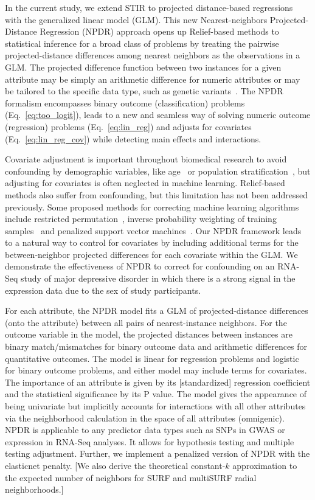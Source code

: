 \documentclass[10pt]{article}
\begin{document}
In the current study, we extend STIR to projected distance-based regressions with the generalized linear model (GLM).
This new Nearest-neighbors Projected-Distance Regression (NPDR) approach opens up Relief-based methods to statistical inference for a broad class of problems by treating the pairwise projected-distance differences among nearest neighbors as the observations in a GLM.
The projected difference function between two instances for a given attribute may be simply an arithmetic difference for numeric attributes or may be tailored to the specific data type, such as genetic variants~\cite{titv}.
The NPDR formalism encompasses binary outcome (classification) problems (Eq.~\ref{eq:too_logit}), leads to a new and seamless way of solving numeric outcome (regression) problems (Eq.~\ref{eq:lin_reg}) and adjusts for covariates (Eq.~\ref{eq:lin_reg_cov}) while detecting main effects and interactions. 

Covariate adjustment is important throughout biomedical research to avoid confounding by demographic variables, like age~\cite{le18_brainagesim} or population stratification~\cite{popstrat16}, but adjusting for covariates is often neglected in machine learning. Relief-based methods also suffer from confounding, but this limitation has not been addressed previously. Some proposed methods for correcting machine learning algorithms include restricted permutation~\cite{rao2017}, inverse probability weighting of training samples~\cite{linn2016} and penalized support vector machines~\cite{li2011ccsvm}. Our NPDR framework leads to a natural way to control for covariates by including additional terms for the between-neighbor projected differences for each covariate within the GLM. We demonstrate the effectiveness of NPDR to correct for confounding on an RNA-Seq study of major depressive disorder in which there is a strong signal in the expression data due to the sex of study participants. 

For each attribute, the NPDR model fits a GLM of projected-distance differences (onto the attribute) between all pairs of nearest-instance neighbors.
For the outcome variable in the model, the projected distances between instances are binary match/mismatches for binary outcome data and arithmetic differences for quantitative outcomes.
The model is linear for regression problems and logistic for binary outcome problems, and either model may include terms for covariates.
The importance of an attribute is given by its [standardized] regression coefficient and the statistical significance by its P value.
The model gives the appearance of being univariate but implicitly accounts for interactions with all other attributes via the neighborhood calculation in the space of all attributes (omnigenic).
NPDR is applicable to any predictor data types such as SNPs in GWAS or expression in RNA-Seq analyses.
It allows for hypothesis testing and multiple testing adjustment.
Further, we implement a penalized version of NPDR with the elasticnet penalty.
[We also derive the theoretical constant-$k$ approximation to the expected number of neighbors for SURF and multiSURF radial neighborhoods.]
\end{document}

